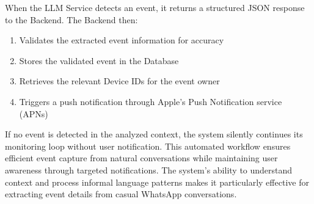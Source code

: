 When the LLM Service detects an event, it returns a structured JSON response to the Backend. The Backend then:
\begin{enumerate}
  \item Validates the extracted event information for accuracy
  \item Stores the validated event in the Database
  \item Retrieves the relevant Device IDs for the event owner
  \item Triggers a push notification through Apple's Push Notification service (APNs)
\end{enumerate}

If no event is detected in the analyzed context, the system silently continues its monitoring loop without user notification. This automated workflow ensures efficient event capture from natural conversations while maintaining user awareness through targeted notifications. The system's ability to understand context and process informal language patterns makes it particularly effective for extracting event details from casual WhatsApp conversations.